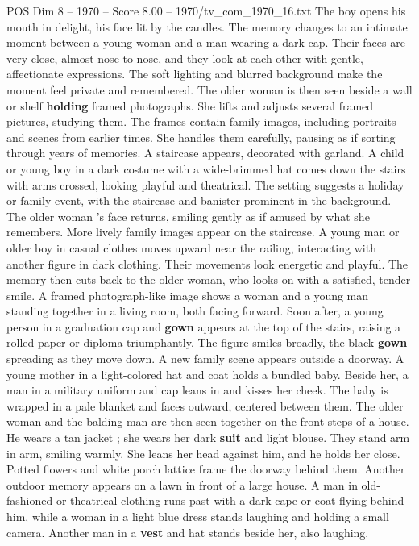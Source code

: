 \begin{textsample}{POS Dim 8 – 1970 – Score 8.00 – 1970/tv\_com\_1970\_16.txt}
The boy opens his mouth in delight, his face lit by the candles.
The memory changes to an intimate moment between a young woman and a man wearing a dark cap.
Their faces are very close, almost nose to nose, and they look at each other with gentle, affectionate expressions.
The soft lighting and blurred background make the moment feel private and remembered.
The older woman is then seen beside a wall or shelf \textbf{holding} framed photographs.
She lifts and adjusts several framed pictures, studying them.
The frames contain family images, including portraits and scenes from earlier times.
She handles them carefully, pausing as if sorting through years of memories.
A staircase appears, decorated with garland.
A child or young boy in a dark costume with a wide-brimmed hat comes down the stairs with arms crossed, looking playful and theatrical.
The setting suggests a holiday or family event, with the staircase and banister prominent in the background.
The older woman ’s face returns, smiling gently as if amused by what she remembers.
More lively family images appear on the staircase.
A young man or older boy in casual clothes moves upward near the railing, interacting with another figure in dark clothing.
Their movements look energetic and playful.
The memory then cuts back to the older woman, who looks on with a satisfied, tender smile.
A framed photograph-like image shows a woman and a young man standing together in a living room, both facing forward.
Soon after, a young person in a graduation cap and \textbf{gown} appears at the top of the stairs, raising a rolled paper or diploma triumphantly.
The figure smiles broadly, the black \textbf{gown} spreading as they move down.
A new family scene appears outside a doorway.
A young mother in a light-colored hat and coat holds a bundled baby.
Beside her, a man in a military uniform and cap leans in and kisses her cheek.
The baby is wrapped in a pale blanket and faces outward, centered between them.
The older woman and the balding man are then seen together on the front steps of a house.
He wears a tan jacket ; she wears her dark \textbf{suit} and light blouse.
They stand arm in arm, smiling warmly.
She leans her head against him, and he holds her close.
Potted flowers and white porch lattice frame the doorway behind them.
Another outdoor memory appears on a lawn in front of a large house.
A man in old-fashioned or theatrical clothing runs past with a dark cape or coat flying behind him, while a woman in a light blue dress stands laughing and holding a small camera.
Another man in a \textbf{vest} and hat stands beside her, also laughing.

\end{textsample}
